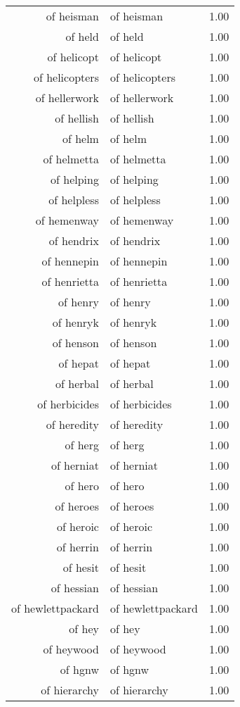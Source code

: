 \begin{table}[ht]
\begin{tabular}{rlr}
  of heisman & of heisman & 1.00 \\ 
  of held & of held & 1.00 \\ 
  of helicopt & of helicopt & 1.00 \\ 
  of helicopters & of helicopters & 1.00 \\ 
  of hellerwork & of hellerwork & 1.00 \\ 
  of hellish & of hellish & 1.00 \\ 
  of helm & of helm & 1.00 \\ 
  of helmetta & of helmetta & 1.00 \\ 
  of helping & of helping & 1.00 \\ 
  of helpless & of helpless & 1.00 \\ 
  of hemenway & of hemenway & 1.00 \\ 
  of hendrix & of hendrix & 1.00 \\ 
  of hennepin & of hennepin & 1.00 \\ 
  of henrietta & of henrietta & 1.00 \\ 
  of henry & of henry & 1.00 \\ 
  of henryk & of henryk & 1.00 \\ 
  of henson & of henson & 1.00 \\ 
  of hepat & of hepat & 1.00 \\ 
  of herbal & of herbal & 1.00 \\ 
  of herbicides & of herbicides & 1.00 \\ 
  of heredity & of heredity & 1.00 \\ 
  of herg & of herg & 1.00 \\ 
  of herniat & of herniat & 1.00 \\ 
  of hero & of hero & 1.00 \\ 
  of heroes & of heroes & 1.00 \\ 
  of heroic & of heroic & 1.00 \\ 
  of herrin & of herrin & 1.00 \\ 
  of hesit & of hesit & 1.00 \\ 
  of hessian & of hessian & 1.00 \\ 
  of hewlettpackard & of hewlettpackard & 1.00 \\ 
  of hey & of hey & 1.00 \\ 
  of heywood & of heywood & 1.00 \\ 
  of hgnw & of hgnw & 1.00 \\ 
  of hierarchy & of hierarchy & 1.00 \\ 

\end{tabular}
\end{table}
